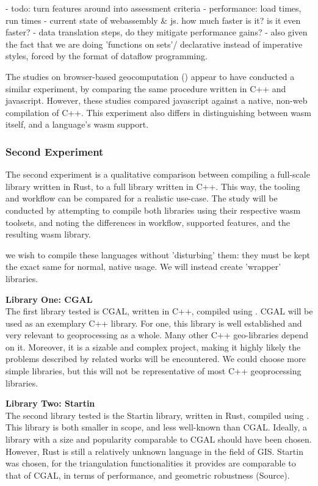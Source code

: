 \begin{note}
  - todo: turn features around into assessment criteria
  - performance: load times, run times
  - current state of webassembly & js. how much faster is it? is it even faster? 
     - data translation steps, do they mitigate performance gains? 
     - also given the fact that we are doing 'functions on sets'/ declarative instead of imperative styles, forced by the format of dataflow programming. 
\end{note}

The studies on browser-based geocomputation () appear to have conducted a similar experiment, by comparing the same procedure written in C++ and javascript. 
However, these studies compared javascript against a native, non-web compilation of C++. 
This experiment also differs in distinguishing between \ac{wasm} itself, and a language's \ac{wasm} support.


\subsubsection{Second Experiment}
The second experiment is a qualitative comparison between compiling a full-scale library written in Rust, to a full library written in C++. 
This way, the tooling and workflow can be compared for a realistic use-case. 
The study will be conducted by attempting to compile both libraries using their respective \ac{wasm} toolsets, and noting the differences in workflow, supported features, and the resulting wasm library. 

we wish to compile these languages without 'disturbing' them: they must be kept the exact same for normal, native usage. 
We will instead create 'wrapper' libraries. 

\textbf{Library One: CGAL} \\
The first library tested is CGAL, written in C++, compiled using .
CGAL will be used as an exemplary C++ library. 
For one, this library is well established and very relevant to geoprocessing as a whole. 
Many other C++ geo-libraries depend on it.
Moreover, it is a sizable and complex project, making it highly likely the problems described by related works will be encountered. 
We could choose more simple libraries, but this will not be representative of most C++ geoprocessing libraries. 

\textbf{Library Two: Startin} \\
The second library tested is the Startin library, written in Rust, compiled using .  
This library is both smaller in scope, and less well-known than CGAL. 
Ideally, a library with a size and popularity comparable to CGAL should have been chosen.
However, Rust is still a relatively unknown language in the field of GIS. 
Startin was chosen, for the triangulation functionalities it provides are comparable to that of CGAL, in terms of performance, and geometric robustness (Source). 

